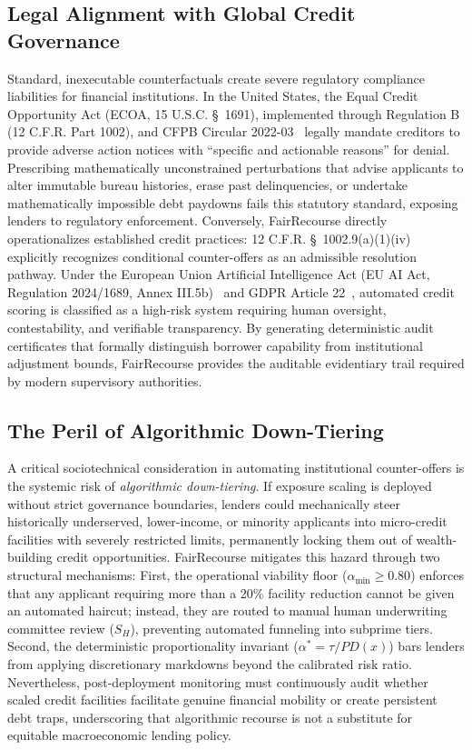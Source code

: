 \documentclass[manuscript,screen,review,anonymous]{acmart}
\begin{document}
\subsection{Legal Alignment with Global Credit Governance}
Standard, inexecutable counterfactuals create severe regulatory compliance liabilities for financial institutions. In the United States, the Equal Credit Opportunity Act (ECOA, 15 U.S.C. \S~1691), implemented through Regulation B (12 C.F.R. Part 1002), and CFPB Circular 2022-03~\cite{cfpb2022circular} legally mandate creditors to provide adverse action notices with ``specific and actionable reasons'' for denial. Prescribing mathematically unconstrained perturbations that advise applicants to alter immutable bureau histories, erase past delinquencies, or undertake mathematically impossible debt paydowns fails this statutory standard, exposing lenders to regulatory enforcement. Conversely, FairRecourse directly operationalizes established credit practices: 12 C.F.R. \S~1002.9(a)(1)(iv) explicitly recognizes conditional counter-offers as an admissible resolution pathway. Under the European Union Artificial Intelligence Act (EU AI Act, Regulation 2024/1689, Annex III.5b)~\cite{euaiact2024} and GDPR Article 22~\cite{gdpr2016}, automated credit scoring is classified as a high-risk system requiring human oversight, contestability, and verifiable transparency. By generating deterministic audit certificates that formally distinguish borrower capability from institutional adjustment bounds, FairRecourse provides the auditable evidentiary trail required by modern supervisory authorities.

\subsection{The Peril of Algorithmic Down-Tiering}
A critical sociotechnical consideration in automating institutional counter-offers is the systemic risk of \emph{algorithmic down-tiering}. If exposure scaling is deployed without strict governance boundaries, lenders could mechanically steer historically underserved, lower-income, or minority applicants into micro-credit facilities with severely restricted limits, permanently locking them out of wealth-building credit opportunities. FairRecourse mitigates this hazard through two structural mechanisms: First, the operational viability floor ($\alpha_{\min} \ge 0.80$) enforces that any applicant requiring more than a 20\% facility reduction cannot be given an automated haircut; instead, they are routed to manual human underwriting committee review ($S_H$), preventing automated funneling into subprime tiers. Second, the deterministic proportionality invariant ($\alpha^* = \tau / PD(x)$) bars lenders from applying discretionary markdowns beyond the calibrated risk ratio. Nevertheless, post-deployment monitoring must continuously audit whether scaled credit facilities facilitate genuine financial mobility or create persistent debt traps, underscoring that algorithmic recourse is not a substitute for equitable macroeconomic lending policy.
\end{document}
